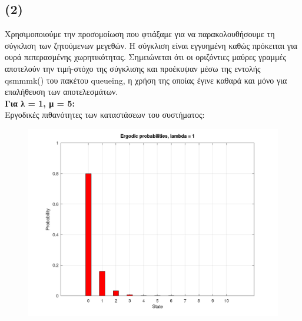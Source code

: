 \documentclass[a4paper]{article}
\begin{document}
\begin{minipage}{\textwidth}
\subsection*{(2)}

Χρησιμοποιούμε την προσομοίωση που φτιάξαμε για να παρακολουθήσουμε τη σύγκλιση των ζητούμενων μεγεθών. Η σύγκλιση είναι εγγυημένη καθώς πρόκειται για ουρά πεπερασμένης χωρητικότητας. Σημειώνεται ότι οι οριζόντιες μαύρες γραμμές αποτελούν την τιμή-στόχο της σύγκλισης και προέκυψαν μέσω της εντολής qsmmmk() του πακέτου queueing, η χρήση της οποίας έγινε καθαρά και μόνο για επαλήθευση των αποτελεσμάτων. \\

\textbf{Για λ = 1, μ = 5:} \\

Εργοδικές πιθανότητες των καταστάσεων του συστήματος:



\begin{figure}[H]
	\includegraphics[width=\textwidth]{images/prob1.png}
\end{figure}

\end{minipage}
\end{document}

